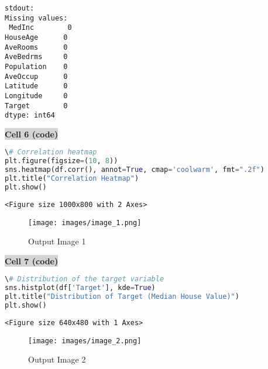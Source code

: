 \documentclass{article}
\begin{document}
\begin{verbatim}
stdout: 
Missing values:
 MedInc        0
HouseAge      0
AveRooms      0
AveBedrms     0
Population    0
AveOccup      0
Latitude      0
Longitude     0
Target        0
dtype: int64

\end{verbatim}


\vspace{0.5cm}
\noindent\colorbox{lightgray}{\textbf{Cell 6 (code)}}
\vspace{0.3cm}


\begin{lstlisting}[language=Python]
\# Correlation heatmap
plt.figure(figsize=(10, 8))
sns.heatmap(df.corr(), annot=True, cmap='coolwarm', fmt=".2f")
plt.title("Correlation Heatmap")
plt.show()
\end{lstlisting}


\begin{verbatim}
<Figure size 1000x800 with 2 Axes>
\end{verbatim}


\begin{figure}[h]
\centering
\texttt{[image: images/image\_1.png]}
\caption{Output Image 1}
\end{figure}


\vspace{0.5cm}
\noindent\colorbox{lightgray}{\textbf{Cell 7 (code)}}
\vspace{0.3cm}


\begin{lstlisting}[language=Python]
\# Distribution of the target variable
sns.histplot(df['Target'], kde=True)
plt.title("Distribution of Target (Median House Value)")
plt.show()
\end{lstlisting}


\begin{verbatim}
<Figure size 640x480 with 1 Axes>
\end{verbatim}


\begin{figure}[h]
\centering
\texttt{[image: images/image\_2.png]}
\caption{Output Image 2}
\end{figure}
\end{document}

